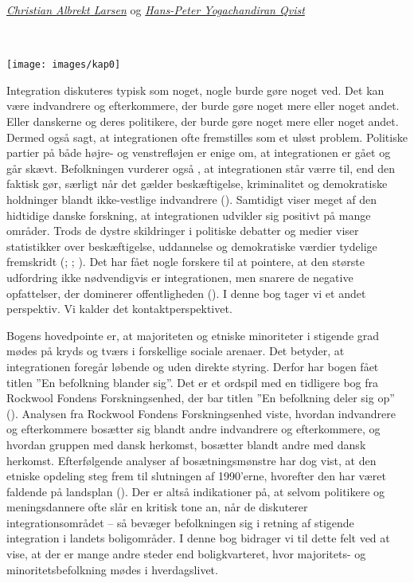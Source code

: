 \documentclass[
]{book}
\begin{document}

\thispagestyle{empty}

\emph{\href{https://vbn.aau.dk/en/persons/albrekt}{Christian Albrekt Larsen}} og \emph{\href{https://vbn.aau.dk/en/persons/hpq}{Hans-Peter Yogachandiran Qvist}}

~~~~

\texttt{[image: images/kap0]}

\newpage

Integration diskuteres typisk som noget, nogle burde gøre noget ved. Det kan være indvandrere og efterkommere, der burde gøre noget mere eller noget andet. Eller danskerne og deres politikere, der burde gøre noget mere eller noget andet. Dermed også sagt, at integrationen ofte fremstilles som et uløst problem. Politiske partier på både højre- og venstrefløjen er enige om, at integrationen er gået og går skævt. Befolkningen vurderer også , at integrationen står værre til, end den faktisk gør, særligt når det gælder beskæftigelse, kriminalitet og demokratiske holdninger blandt ikke-vestlige indvandrere (). Samtidigt viser meget af den hidtidige danske forskning, at integrationen udvikler sig positivt på mange områder. Trods de dystre skildringer i politiske debatter og medier viser statistikker over beskæftigelse, uddannelse og demokratiske værdier tydelige fremskridt (; ; ). Det har fået nogle forskere til at pointere, at den største udfordring ikke nødvendigvis er integrationen, men snarere de negative opfattelser, der dominerer offentligheden (). I denne bog tager vi et andet perspektiv. Vi kalder det kontaktperspektivet.

Bogens hovedpointe er, at majoriteten og etniske minoriteter i stigende grad mødes på kryds og tværs i forskellige sociale arenaer. Det betyder, at integrationen foregår løbende og uden direkte styring. Derfor har bogen fået titlen ''En befolkning blander sig''. Det er et ordspil med en tidligere bog fra Rockwool Fondens Forskningsenhed, der bar titlen ''En befolkning deler sig op'' (). Analysen fra Rockwool Fondens Forskningsenhed viste, hvordan indvandrere og efterkommere bosætter sig blandt andre indvandrere og efterkommere, og hvordan gruppen med dansk herkomst, bosætter blandt andre med dansk herkomst. Efterfølgende analyser af bosætningsmønstre har dog vist, at den etniske opdeling steg frem til slutningen af 1990'erne, hvorefter den har været faldende på landsplan (). Der er altså indikationer på, at selvom politikere og meningsdannere ofte slår en kritisk tone an, når de diskuterer integrationsområdet -- så bevæger befolkningen sig i retning af stigende integration i landets boligområder. I denne bog bidrager vi til dette felt ved at vise, at der er mange andre steder end boligkvarteret, hvor majoritets- og minoritetsbefolkning mødes i hverdagslivet.
\end{document}
